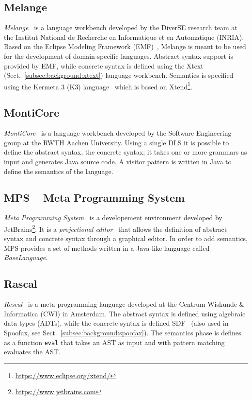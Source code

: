 \subsection{Melange}\label{subsec:background:melange}
\textit{Melange}~\cite{Degueule15}  is a language workbench developed by the DiverSE research team at the Institut National de Recherche en Informatique et en Automatique (INRIA). Based on the Eclipse Modeling Framework (EMF)~\cite{Steinberg08}, Melange is meant to be used for the development of domain-specific languages. Abstract syntax support is provided by EMF, while concrete syntax is defined using the Xtext (Sect.~\ref{subsec:background:xtext}) language workbench.
Semantics is specified using the Kermeta 3 (K3) language~\cite{Jezequel15} which is based on Xtend\footnote{\url{https://www.eclipse.org/xtend/}}.

\subsection{MontiCore}\label{subsec:background:monticore}
\textit{MontiCore}~\cite{Krahn10} is a language workbench developed by the Software Engineering group at the RWTH Aachen University. Using a single DLS it is possible to define the abstract syntax, the concrete syntax; it takes one or more grammars as input and generates Java source code.
A visitor pattern is written in Java to define the semantics of the language.

\subsection{MPS -- Meta Programming System}\label{subsec:background:mps}
\textit{Meta Programming System}~\cite{Volter11, Voelter12} is a developement environment developed by JetBrains\footnote{\url{https://www.jetbrains.com}}. It is a \textit{projectional editor}~\cite{Voelter14} that allows the definition of abstract syntax and concrete syntax through a graphical editor. In order to add semantics, MPS provides a set of methods written in a Java-like language called \textit{BaseLanguage}.

\subsection{Rascal}\label{subsec:background:rascal}

\textit{Rescal}~\cite{Klint09b} is a meta-programming language developed at the Centrum Wiskunde \& Informatica (CWI) in Amsterdam. The abstract syntax is defined using algebraic data types (ADTs), while the concrete syntax is defined SDF~\cite{Heering89c} (also used in Spoofax, see Sect.~\ref{subsec:background:spoofax}). The semantics phase is defines as a function \texttt{eval} that takes an AST as input and with pattern matching evaluates the AST.


